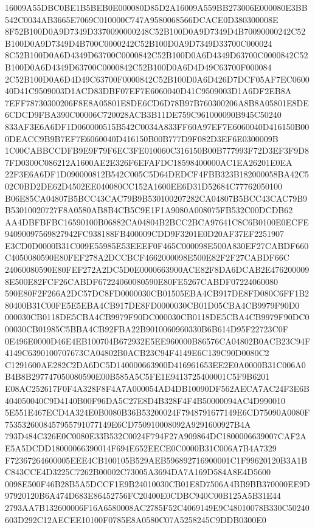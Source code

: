 \documentclass[UTF8,fontset=fandol,zihao=-4,a4paper]{ctexart}
\begin{document}
{{16009A55DBC0BE1B5BEB0E000080D85D2A16009A559BB273006E000080E3BB542C0034AB3665E7069C010000C747A9580068566DCACE0D380300008E
8F52B100D0A9D7349D3370090000248C52B100D0A9D7349D4B70090000242C52B100D0A9D7349D4B700C0000242C52B100D0A9D7349D33700C000024
8C52B100D0A6D4349D63700C0000842C52B100D0A6D4349D63700C0000842C52B100D0A6D4349D63700C0000842C52B100D0A6D4D49C63700F000084
2C52B100D0A6D4D49C63700F0000842C52B100D0A6D426D7DCF05AF7EC060040D41C9509003D1ACD83DBF07EF7E6060040D41C9509003D1A6DF2EB8A
7EFF78730300206F8E8A05801E8DE6CD6D78B97B760300206A8B8A05801E8DE6CDCD9FBA390C00006C720028ACB3B11DE759C961000090B945C50240
833AF3E6A6DF1D060000515B542C0034A833FF60A97EF7E6060040D416150B000DEACC9B9B7EF7E6060040D416150B00B777D9F082D3EF6E0300009B
1C00CABBCCDFB9E9F79F6EC3FE010060C316150B00B777993F72D3EF3F9D87FD0300C086212A1600AE2E326F6EFAFDC18598400000AC1EA26201E0EA
22F3E6A6DF1D090000812B542C005C5D64DEDCF4FBB323B182000058BA42C502C0BD2DE62D4502EE040080CC152A1600EE6D31D52684C77762050100
B06E85CA04807B5BCC43CAC79B9B530100207282CA04807B5BCC43CAC79B9B53010020727F8A0580AB8B4CB5C9E1F1A9080A008075FB532C00DCDB62
AA4DBFBFBC16590100B06882CA04804B2BCC2BCA97641C8C6B0100E0ECFE94090097569827942FC938188FB400009CDD9F3201E0D20AF37EF2251907
E3CD0D0000B31C009E55985E53EEEF0F465C000098E500A830EF27CABDF660C4050080590E80FEF278A2DCCBCF4662000098E500E82F2F27CABDF66C
24060080590E80FEF272A2DC5D0E0000663900ACE82F8DA6DCAB2E4762000098E500E82FCF26CABDF67224060080590E80FE5267CABDF07224060080
590E80F2F266A2DC57DC8FD0000030CB01505EBA4CB917DE8FD080C6FF1B280400B31C00FE5E5EBA4CB917DE8FD0000030CB01D05CBA4CB9979F90D0
000030CB0118DE5CBA4CB9979F90DC000030CB0118DE5CBA4CB9979F90DC000030CB01985C5BBA4CB92FBA22B9010060960330B6B614D95F22723C0F
0E496E0000D46E4EB100704B672932E5EE960000B86576CA04802B0ACB23C94F4149C6390100707673CA04802B0ACB23C94F4149E6C139C90D0080C2
C1291600AE282C2DA6DC5D140000663900D416961653EE2E0A0000B31C006A0B4B8B297747050080590E00B585A5C5FE1E9413725400001C5F9B6201
E08AC252617F0F4A328F8F4A7A000054AD4DB10090DF562AECA7AC24F3E6B404050040C9D4140B00F96DA5C27E8D4B328F4F4B50000094AC4D990010
5E551E467ECD4A324E0B0080B36B53200024F7948791677149E6CD75090A0080F7535326008457955791077149E6CD750910008092A9291600927B4A
793D484C326E0C0080E33B532C0024F794F27A909864DC1800006639007CAF2AE5A5DCDD18000066390014F694E652EECE0C0000B31C006A7B4A7329
F72367264600005EEE4CB100105B529AEB596892716900001C1F99620120B3A1BC843CCE4D3225C7262B00002C73005A3694DA7A169D584A8E4D5600
0098E500F46B28B5A5DCCF1E9B24010030CB01E8D7506A4BB9BB370000EE9D97920120B6A474D683E86452756FC20400E0CDBC940C00B125A5B31E44
2793AA7B132600006F16A6580008AC2785F52C4069149E9C48010078B330C50240603D292C12AECEE10100F0785E8A0580C07A5258245C9DDB0300E0
}}
\end{document}
